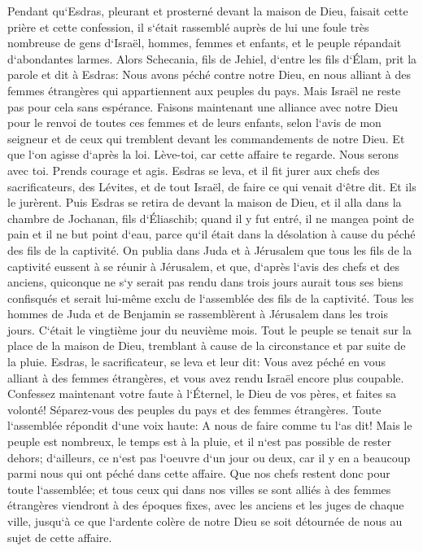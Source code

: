 \verse Pendant qu`Esdras, pleurant et prosterné devant la maison de Dieu, faisait cette prière et cette confession, il s`était rassemblé auprès de lui une foule très nombreuse de gens d`Israël, hommes, femmes et enfants, et le peuple répandait d`abondantes larmes. 
\verse Alors Schecania, fils de Jehiel, d`entre les fils d`Élam, prit la parole et dit à Esdras: Nous avons péché contre notre Dieu, en nous alliant à des femmes étrangères qui appartiennent aux peuples du pays. Mais Israël ne reste pas pour cela sans espérance. 
\verse Faisons maintenant une alliance avec notre Dieu pour le renvoi de toutes ces femmes et de leurs enfants, selon l`avis de mon seigneur et de ceux qui tremblent devant les commandements de notre Dieu. Et que l`on agisse d`après la loi. 
\verse Lève-toi, car cette affaire te regarde. Nous serons avec toi. Prends courage et agis. 
\verse Esdras se leva, et il fit jurer aux chefs des sacrificateurs, des Lévites, et de tout Israël, de faire ce qui venait d`être dit. Et ils le jurèrent. 
\verse Puis Esdras se retira de devant la maison de Dieu, et il alla dans la chambre de Jochanan, fils d`Éliaschib; quand il y fut entré, il ne mangea point de pain et il ne but point d`eau, parce qu`il était dans la désolation à cause du péché des fils de la captivité. 
\verse On publia dans Juda et à Jérusalem que tous les fils de la captivité eussent à se réunir à Jérusalem, 
\verse et que, d`après l`avis des chefs et des anciens, quiconque ne s`y serait pas rendu dans trois jours aurait tous ses biens confisqués et serait lui-même exclu de l`assemblée des fils de la captivité. 
\verse Tous les hommes de Juda et de Benjamin se rassemblèrent à Jérusalem dans les trois jours. C`était le vingtième jour du neuvième mois. Tout le peuple se tenait sur la place de la maison de Dieu, tremblant à cause de la circonstance et par suite de la pluie. 
\verse Esdras, le sacrificateur, se leva et leur dit: Vous avez péché en vous alliant à des femmes étrangères, et vous avez rendu Israël encore plus coupable. 
\verse Confessez maintenant votre faute à l`Éternel, le Dieu de vos pères, et faites sa volonté! Séparez-vous des peuples du pays et des femmes étrangères. 
\verse Toute l`assemblée répondit d`une voix haute: A nous de faire comme tu l`as dit! 
\verse Mais le peuple est nombreux, le temps est à la pluie, et il n`est pas possible de rester dehors; d`ailleurs, ce n`est pas l`oeuvre d`un jour ou deux, car il y en a beaucoup parmi nous qui ont péché dans cette affaire. 
\verse Que nos chefs restent donc pour toute l`assemblée; et tous ceux qui dans nos villes se sont alliés à des femmes étrangères viendront à des époques fixes, avec les anciens et les juges de chaque ville, jusqu`à ce que l`ardente colère de notre Dieu se soit détournée de nous au sujet de cette affaire. 
